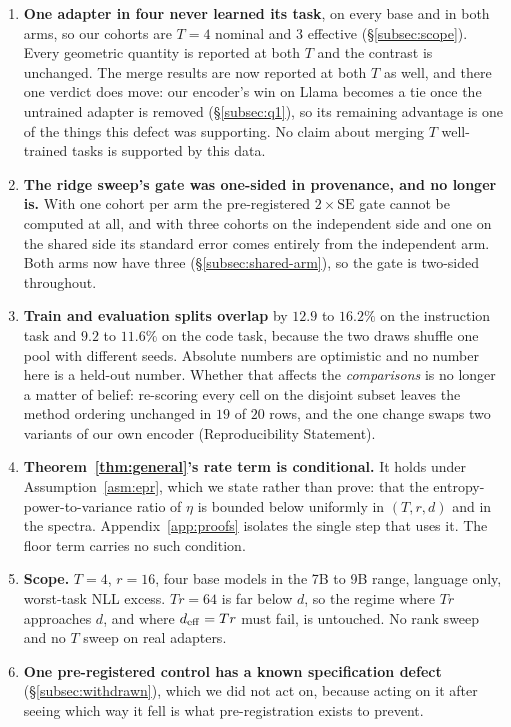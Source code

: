 \begin{enumerate}
  throughout, so no verdict in Table~\ref{tab:q1} moves.
\item \textbf{One adapter in four never learned its task}, on every base and
  in both arms, so our cohorts are $T=4$ nominal and $3$ effective
  (\S\ref{subsec:scope}). Every geometric quantity is reported at both $T$
  and the contrast is unchanged. The merge results are now reported at both
  $T$ as well, and there one verdict does move: our encoder's win on Llama
  becomes a tie once the untrained adapter is removed (\S\ref{subsec:q1}),
  so its remaining advantage is one of the things this defect was
  supporting. No claim about merging $T$ well-trained tasks is supported by
  this data.
\item \textbf{The ridge sweep's gate was one-sided in provenance, and no
  longer is.} With one cohort per arm the pre-registered
  $2\times\mathrm{SE}$ gate cannot be computed at all, and with three
  cohorts on the independent side and one on the shared side its standard
  error comes entirely from the independent arm. Both arms now have three
  (\S\ref{subsec:shared-arm}), so the gate is two-sided throughout.
\item \textbf{Train and evaluation splits overlap} by $12.9$ to $16.2\%$ on
  the instruction task and $9.2$ to $11.6\%$ on the code task, because the
  two draws shuffle one pool with different seeds. Absolute numbers are
  optimistic and no number here is a held-out number. Whether that affects
  the \emph{comparisons} is no longer a matter of belief: re-scoring every
  cell on the disjoint subset leaves the method ordering unchanged in $19$
  of $20$ rows, and the one change swaps two variants of our own encoder
  (Reproducibility Statement).
\item \textbf{Theorem~\ref{thm:general}'s rate term is conditional.} It holds
  under Assumption~\ref{asm:epr}, which we state rather than prove: that the
  entropy-power-to-variance ratio of $\eta$ is bounded below uniformly in
  $(T, r, d)$ and in the spectra. Appendix~\ref{app:proofs} isolates the single
  step that uses it. The floor term carries no such condition.
\item \textbf{Scope.} $T=4$, $r=16$, four base models in the 7B to 9B range,
  language only, worst-task NLL excess. $Tr = 64$ is far below $d$, so the
  regime where $Tr$ approaches $d$, and where $d_{\mathrm{eff}} = Tr$ must fail, is
  untouched. No rank sweep and no $T$ sweep on real adapters.
\item \textbf{One pre-registered control has a known specification defect}
  (\S\ref{subsec:withdrawn}), which we did not act on, because acting on it
  after seeing which way it fell is what pre-registration exists to prevent.
\end{enumerate}

